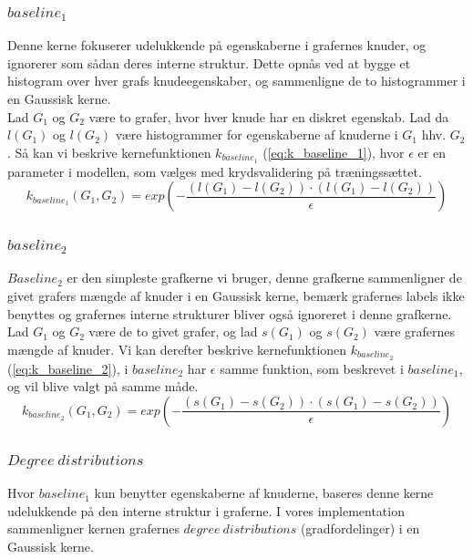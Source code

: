 \documentclass{article}
\begin{document}
\subsubsection{$baseline_1$}
\label{section:baseline_1}
Denne kerne fokuserer udelukkende på egenskaberne i grafernes knuder, og ignorerer som sådan deres interne struktur. Dette opnås ved at bygge et histogram over hver grafs knudeegenskaber, og sammenligne de to histogrammer i en Gaussisk kerne.\\
Lad $G_1$ og $G_2$ være to grafer, hvor hver knude har en diskret egenskab. Lad da $l(G_1)$ og $l(G_2)$ være histogrammer for egenskaberne af knuderne i $G_1$ hhv. $G_2$. Så kan vi beskrive kernefunktionen $k_{baseline_1}$ (\ref{eq:k_baseline_1}), hvor $\epsilon$ er en parameter i modellen, som vælges med krydsvalidering på træningssættet.
\begin{equation}
\label{eq:k_baseline_1}
k_{baseline_1}(G_1,G_2)=exp\left(-\frac{\left(l(G_1)- l(G_2)\right)\cdot\left(l(G_1)- l(G_2)\right)}{\epsilon}\right)
\end{equation}


\subsubsection{$baseline_2$}
\label{section:baseline_2}
$Baseline_2$ er den simpleste grafkerne vi bruger, denne grafkerne sammenligner de givet grafers mængde af knuder i en Gaussisk kerne, bemærk grafernes labels ikke benyttes og grafernes interne strukturer bliver også ignoreret i denne grafkerne. \\
Lad $G_1$ og $G_2$ være de to givet grafer, og lad $s(G_1)$ og $s(G_2)$ være grafernes mængde af knuder. Vi kan derefter beskrive kernefunktionen $k_{baseline_2}$ (\ref{eq:k_baseline_2}), i $baseline_2$ har $\epsilon$ samme funktion, som beskrevet i $baseline_1$, og vil blive valgt på samme måde.
\begin{equation}
\label{eq:k_baseline_2}
k_{baseline_2}(G_1,G_2)=exp\left(-\frac{\left(s(G_1)- s(G_2)\right)\cdot\left(s(G_1)- s(G_2)\right)}{\epsilon}\right)
\end{equation}

\subsubsection{$Degree\ distributions$}
\label{section:degree_distributions}
Hvor $baseline_1$ kun benytter egenskaberne af knuderne, baseres denne kerne udelukkende  på den interne struktur i graferne. I vores implementation sammenligner kernen grafernes $degree\ distributions$ (gradfordelinger) i en Gaussisk kerne.
\end{document}
